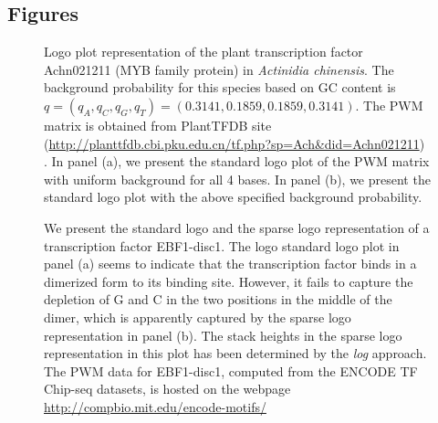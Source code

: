 \documentclass{bmcart}
\begin{document}
\begin{backmatter}



\section*{Figures}

 \begin{figure}[h!] 
  \caption{
      Logo plot representation of the plant transcription factor Achn021211 (MYB family protein) in \textit{Actinidia chinensis}. The background probability for this species based on GC content is $q = \left (q_A, q_C, q_G, q_T \right) = \left (0.3141, 0.1859, 0.1859, 0.3141 \right )$. The PWM matrix is obtained from PlantTFDB site (\url{http://planttfdb.cbi.pku.edu.cn/tf.php?sp=Ach&did=Achn021211}) \cite{Jin2017}. In panel (a), we present the standard logo plot of the PWM matrix with uniform background for all 4 bases. In panel (b), we present the standard logo plot with the above specified background probability.}
 \label{fig:fig0}
\end{figure}


\begin{figure}[h!] 
  \caption{
      We present the standard logo and the sparse logo representation of a transcription factor EBF1-disc1. The logo standard logo plot in panel (a) seems to indicate that the transcription factor binds in a dimerized form to its binding site. However, it fails to capture the depletion of G and C in the two positions in the middle of the dimer, which is apparently captured by the sparse logo representation in panel (b). The stack heights in the sparse logo representation in this plot has been determined by the \textit{log} approach. The PWM data for EBF1-disc1, computed from the ENCODE TF Chip-seq datasets, is hosted on the webpage \url{http://compbio.mit.edu/encode-motifs/}\cite{Kheradpour2013}}    
\label{fig:fig1}
\end{figure}



\end{backmatter}
\end{document}
